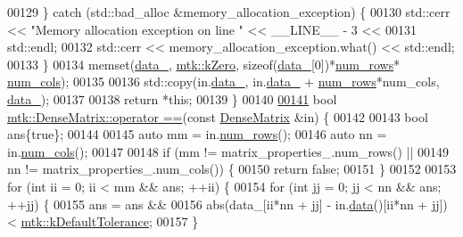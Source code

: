 \begin{DoxyCode}
00129   \} \textcolor{keywordflow}{catch} (std::bad\_alloc &memory\_allocation\_exception) \{
00130     std::cerr << \textcolor{stringliteral}{"Memory allocation exception on line "} << \_\_LINE\_\_ - 3 <<
00131       std::endl;
00132     std::cerr << memory\_allocation\_exception.what() << std::endl;
00133   \}
00134   memset(\hyperlink{classmtk_1_1DenseMatrix_a7893e4e5c8d2e2de32b156177e78cb6f}{data\_}, \hyperlink{group__c01-roots_ga59a451a5fae30d59649bcda274fea271}{mtk::kZero}, \textcolor{keyword}{sizeof}(\hyperlink{classmtk_1_1DenseMatrix_a7893e4e5c8d2e2de32b156177e78cb6f}{data\_}[0])*\hyperlink{classmtk_1_1DenseMatrix_a17d8d3b9cc0926044b6972dd190a5c21}{num\_rows}*
      \hyperlink{classmtk_1_1DenseMatrix_af6f78373aaf2136f0c78974d7c8de0a8}{num\_cols});
00135 
00136   std::copy(in.\hyperlink{classmtk_1_1DenseMatrix_a7893e4e5c8d2e2de32b156177e78cb6f}{data\_}, in.\hyperlink{classmtk_1_1DenseMatrix_a7893e4e5c8d2e2de32b156177e78cb6f}{data\_} + \hyperlink{classmtk_1_1DenseMatrix_a17d8d3b9cc0926044b6972dd190a5c21}{num\_rows}*num\_cols, \hyperlink{classmtk_1_1DenseMatrix_a7893e4e5c8d2e2de32b156177e78cb6f}{data\_});
00137 
00138   \textcolor{keywordflow}{return} *\textcolor{keyword}{this};
00139 \}
00140 
\hypertarget{mtk__dense__matrix_8cc_source_l00141}{}\hyperlink{classmtk_1_1DenseMatrix_a94ab5a02d9cf81c17b6f68f4c41cb797}{00141} \textcolor{keywordtype}{bool} \hyperlink{classmtk_1_1DenseMatrix_a94ab5a02d9cf81c17b6f68f4c41cb797}{mtk::DenseMatrix::operator ==}(\textcolor{keyword}{const} 
      \hyperlink{classmtk_1_1DenseMatrix}{DenseMatrix} &in) \{
00142 
00143   \textcolor{keywordtype}{bool} ans\{\textcolor{keyword}{true}\};
00144 
00145   \textcolor{keyword}{auto} mm = in.\hyperlink{classmtk_1_1DenseMatrix_a17d8d3b9cc0926044b6972dd190a5c21}{num\_rows}();
00146   \textcolor{keyword}{auto} nn = in.\hyperlink{classmtk_1_1DenseMatrix_af6f78373aaf2136f0c78974d7c8de0a8}{num\_cols}();
00147 
00148   \textcolor{keywordflow}{if} (mm != matrix\_properties\_.num\_rows() ||
00149       nn != matrix\_properties\_.num\_cols()) \{
00150     \textcolor{keywordflow}{return} \textcolor{keyword}{false};
00151   \}
00152 
00153   \textcolor{keywordflow}{for} (\textcolor{keywordtype}{int} ii = 0; ii < mm && ans; ++ii) \{
00154     \textcolor{keywordflow}{for} (\textcolor{keywordtype}{int} jj = 0; jj < nn && ans; ++jj) \{
00155       ans = ans &&
00156         abs(data\_[ii*nn + jj] - in.\hyperlink{classmtk_1_1DenseMatrix_a16b3ff56feb2658b9fc7147d1de4d8e7}{data}()[ii*nn + jj]) < 
      \hyperlink{group__c01-roots_gae914b125d81d1b97e0aee7bbc7739786}{mtk::kDefaultTolerance};
00157     \}

\end{DoxyCode}
